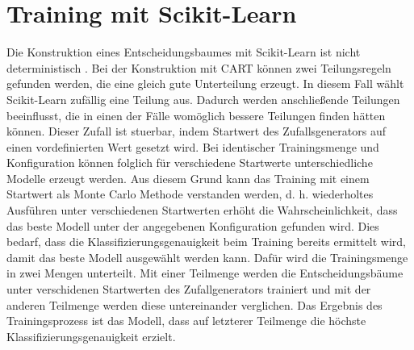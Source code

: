 \section{Training mit Scikit-Learn}
Die Konstruktion eines Entscheidungsbaumes mit Scikit-Learn ist nicht deterministisch \cite{dymelThesis}.
Bei der Konstruktion mit CART können zwei Teilungsregeln gefunden werden, die eine gleich gute Unterteilung erzeugt.
In diesem Fall wählt Scikit-Learn zufällig eine Teilung aus.
Dadurch werden anschließende Teilungen beeinflusst, die in einen der Fälle womöglich bessere Teilungen finden hätten können.
Dieser Zufall ist stuerbar, indem Startwert des Zufallsgenerators auf einen vordefinierten Wert gesetzt wird.
\newline
\newline
Bei identischer Trainingsmenge und Konfiguration können folglich für verschiedene Startwerte unterschiedliche Modelle erzeugt werden.
Aus diesem Grund kann das Training mit einem Startwert als Monte Carlo Methode verstanden werden, d. h. wiederholtes Ausführen unter verschiedenen Startwerten erhöht die Wahrscheinlichkeit, dass das
beste Modell unter der angegebenen Konfiguration gefunden wird.
\newline
\newline
Dies bedarf, dass die Klassifizierungsgenauigkeit beim Training bereits ermittelt wird, damit das beste Modell ausgewählt werden kann.
Dafür wird die Trainingsmenge in zwei Mengen unterteilt. Mit einer Teilmenge werden die Entscheidungsbäume unter verschidenen Startwerten des Zufallgenerators trainiert und
mit der anderen Teilmenge werden diese untereinander verglichen. Das Ergebnis des Trainingsprozess ist das Modell, dass auf letzterer Teilmenge die höchste
Klassifizierungsgenauigkeit erzielt.